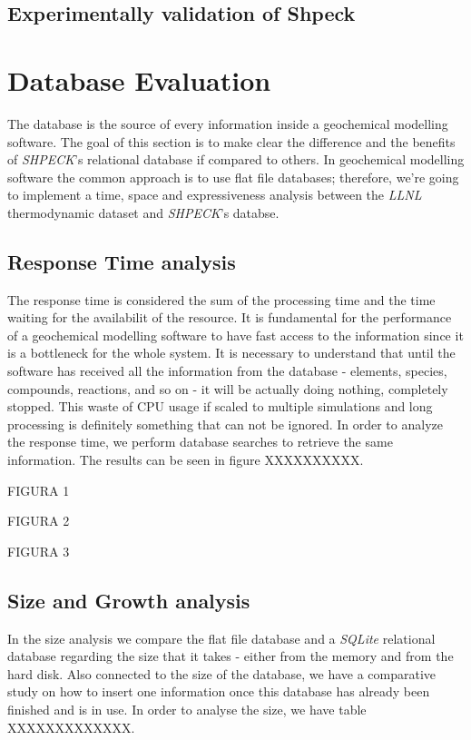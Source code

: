 \subsection{Experimentally validation of Shpeck}


\section{Database Evaluation}
The database is the source of every information inside a geochemical modelling software. The goal of this section is to make clear the difference and the benefits of \emph{SHPECK}'s relational database if compared to others. In geochemical modelling software the common approach is to use flat file databases; therefore, we're going to implement a time, space and expressiveness analysis between the \emph{LLNL} thermodynamic dataset and \emph{SHPECK}'s databse. 


\subsection{Response Time analysis}
The response time is considered the sum of the processing time and the time waiting for the availabilit of the resource. It is fundamental for the performance of a geochemical modelling software to have fast access to the information since it is a bottleneck for the whole system. 
It is necessary to understand that until the software has received all the information from the database - elements, species, compounds, reactions, and so on - it will be actually doing nothing, completely stopped. This waste of CPU usage if scaled to multiple simulations and long processing is definitely something that can not be ignored. 
In order to analyze the response time, we perform database searches to retrieve the same information. The results can be seen in figure XXXXXXXXXX.

FIGURA 1 

FIGURA 2

FIGURA 3

\subsection{Size and Growth analysis}
In the size analysis we compare the flat file database and a \emph{SQLite} relational database regarding the size that it takes - either from the memory and from the hard disk. Also connected to the size of the database, we have a comparative study on how to insert one information once this database has already been finished and is in use.
In order to analyse the size, we have table XXXXXXXXXXXXX.

